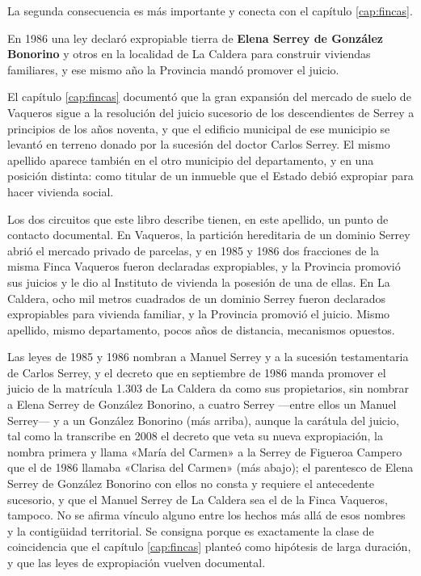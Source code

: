 \begin{cautela}
La segunda consecuencia es más importante y conecta con el capítulo \ref{cap:fincas}.

En 1986 una ley declaró expropiable tierra de \textbf{Elena Serrey de González Bonorino} y otros en la localidad de La Caldera para construir viviendas familiares, y ese mismo año la Provincia mandó promover el juicio.

El capítulo \ref{cap:fincas} documentó que la gran expansión del mercado de suelo de Vaqueros sigue a la resolución del juicio sucesorio de los descendientes de Serrey a principios de los años noventa, y que el edificio municipal de ese municipio se levantó en terreno donado por la sucesión del doctor Carlos Serrey. El mismo apellido aparece también en el otro municipio del departamento, y en una posición distinta: como titular de un inmueble que el Estado debió expropiar para hacer vivienda social.

Los dos circuitos que este libro describe tienen, en este apellido, un punto de contacto documental. En Vaqueros, la partición hereditaria de un dominio Serrey abrió el mercado privado de parcelas, y en 1985 y 1986 dos fracciones de la misma Finca Vaqueros fueron declaradas expropiables, y la Provincia promovió sus juicios y le dio al Instituto de vivienda la posesión de una de ellas. En La Caldera, ocho mil metros cuadrados de un dominio Serrey fueron declarados expropiables para vivienda familiar, y la Provincia promovió el juicio. Mismo apellido, mismo departamento, pocos años de distancia, mecanismos opuestos.

Las leyes de 1985 y 1986 nombran a Manuel Serrey y a la sucesión testamentaria de Carlos Serrey, y el decreto que en septiembre de 1986 manda promover el juicio de la matrícula 1.303 de La Caldera da como sus propietarios, sin nombrar a Elena Serrey de González Bonorino, a cuatro Serrey ---entre ellos un Manuel Serrey--- y a un González Bonorino (más arriba), aunque la carátula del juicio, tal como la transcribe en 2008 el decreto que veta su nueva expropiación, la nombra primera y llama «María del Carmen» a la Serrey de Figueroa Campero que el de 1986 llamaba «Clarisa del Carmen» (más abajo); el parentesco de Elena Serrey de González Bonorino con ellos no consta y requiere el antecedente sucesorio, y que el Manuel Serrey de La Caldera sea el de la Finca Vaqueros, tampoco. No se afirma vínculo alguno entre los hechos más allá de esos nombres y la contigüidad territorial. Se consigna porque es exactamente la clase de coincidencia que el capítulo \ref{cap:fincas} planteó como hipótesis de larga duración, y que las leyes de expropiación vuelven documental.
\end{cautela}

